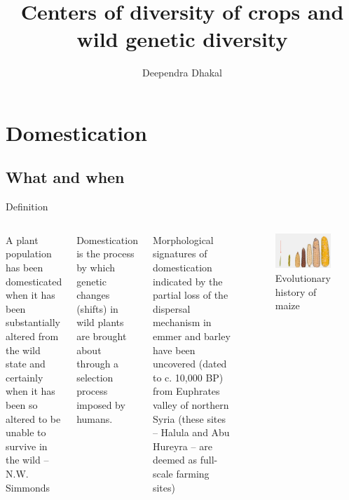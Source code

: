 \documentclass[
  ignorenonframetext,
  aspectratio=169]{beamer}
\title{Centers of diversity of crops and wild genetic diversity}
\author{Deependra Dhakal}
\date{}
\institute{College of Natural Resource Management, Tikapur,
Kailali \and Agriculture and Forestry University}
\begin{document}
\frame{\titlepage}

\begin{frame}[allowframebreaks]
  \tableofcontents[hideallsubsections]
\end{frame}
\hypertarget{domestication}{%
\section{Domestication}\label{domestication}}

\hypertarget{what-and-when}{%
\subsection{What and when}\label{what-and-when}}

\begin{frame}{Definition}
\protect\hypertarget{definition}{}
\begin{columns}{}
\begin{block}{}
A plant population has been domesticated when it has been substantially altered from the wild state and certainly when it has been so altered to be unable to survive in the wild
-- N.W. Simmonds
\end{block}

\begin{block}{}
Domestication is the process by which genetic changes (shifts) in wild plants are brought about through a selection process imposed by humans.
\end{block}

\footnotesize Morphological signatures of domestication indicated by the partial loss of the dispersal mechanism in emmer and barley have been uncovered (dated to c. 10,000 BP) from Euphrates valley of northern Syria (these sites -- Halula and Abu Hureyra -- are deemed as full-scale farming sites)


\begin{figure}
\includegraphics[width=0.9\linewidth]{./../images/maize_breeding} \caption{Evolutionary history of maize}\label{fig:maize-domestication}
\end{figure}

\end{columns}
\end{frame}
\end{document}
